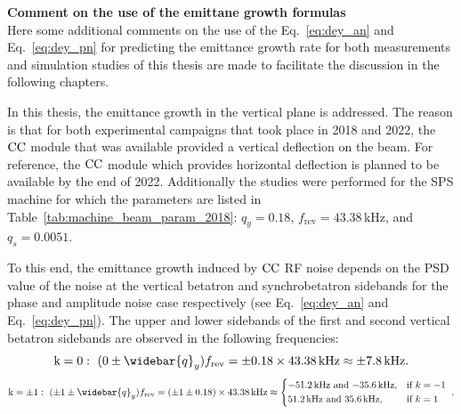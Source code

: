 \textbf{Comment on the use of the emittane growth formulas}\\
Here some additional comments on the use of the Eq.~\eqref{eq:dey_an} and Eq.~\eqref{eq:dey_pn} for predicting the emittance growth rate for both measurements and simulation studies of this thesis are made to facilitate the discussion in the following chapters.

In this thesis, the emittance growth in the vertical plane is addressed. The reason is that for both experimental campaigns that took place in 2018 and 2022, the ${\mathrm{CC}}$ module that was available provided a vertical deflection on the beam. For reference, the ${\mathrm{CC}}$ module which provides horizontal deflection is planned to be available by the end of 2022. Additionally the studies were performed for the SPS machine for which the parameters are listed in Table~\ref{tab:machine_beam_param_2018}: $q_y=0.18$, $f_\mathrm{rev}=43.38$\,kHz, and $q_s=0.0051$. 

To this end, the emittance growth induced by ${\mathrm{CC}}$ RF noise depends on the PSD value of the noise at the vertical betatron and synchrobetatron sidebands for the phase and amplitude noise case respectively (see Eq.~\eqref{eq:dey_an} and Eq.~\eqref{eq:dey_pn}). The upper and lower sidebands of the first and second vertical betatron sidebands are observed in the following frequencies:
\begin{equation}\label{eq:betatron_sideband_1}
    \mathrm{k=0}: \ (0 \pm \widebar{q}_y) f_\mathrm{rev} = \pm 0.18 \times 43.38\mathrm{\,kHz} \approx \pm 7.8\mathrm{\,kHz}.
\end{equation}
\begin{equation}\label{eq:betatron_sideband_2}
    \mathrm{k= \pm 1}: \ (\pm 1 \pm \widebar{q}_y) f_\mathrm{rev} = (\pm 1 \pm 0.18) \times 43.38\mathrm{\,kHz} \approx \begin{dcases*} 
        \text{$-$51.2\,kHz and $-$35.6\,kHz,} & if  $k=-1$ \\ 
        \text{51.2\,kHz and 35.6\,kHz,} & if  $k=1$  
        \end{dcases*} .
\end{equation}

